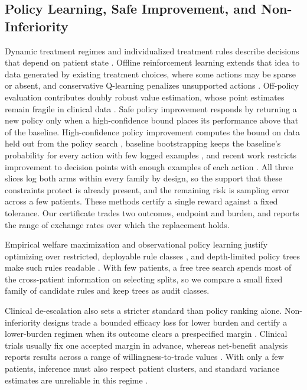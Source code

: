 \documentclass[conference]{IEEEtran}
\begin{document}
\subsection{Policy Learning, Safe Improvement, and Non-Inferiority}

Dynamic treatment regimes and individualized treatment rules describe decisions that depend on patient state \cite{murphy2003, qian2011}. Offline reinforcement learning extends that idea to data generated by existing treatment choices, where some actions may be sparse or absent, and conservative Q-learning penalizes unsupported actions \cite{levine2020, kumar2020}. Off-policy evaluation contributes doubly robust value estimation, whose point estimates remain fragile in clinical data \cite{dudik2011}. Safe policy improvement responds by returning a new policy only when a high-confidence bound places its performance above that of the baseline. High-confidence policy improvement computes the bound on data held out from the policy search \cite{thomas2015}, baseline bootstrapping keeps the baseline's probability for every action with few logged examples \cite{laroche2019}, and recent work restricts improvement to decision points with enough examples of each action \cite{sharma2025}. All three slices log both arms within every family by design, so the support that these constraints protect is already present, and the remaining risk is sampling error across a few patients. These methods certify a single reward against a fixed tolerance. Our certificate trades two outcomes, endpoint and burden, and reports the range of exchange rates over which the replacement holds.

Empirical welfare maximization and observational policy learning justify optimizing over restricted, deployable rule classes \cite{kitagawa2018, athey2021}, and depth-limited policy trees make such rules readable \cite{zhou2018}. With few patients, a free tree search spends most of the cross-patient information on selecting splits, so we compare a small fixed family of candidate rules and keep trees as audit classes.

Clinical de-escalation also sets a stricter standard than policy ranking alone. Non-inferiority designs trade a bounded efficacy loss for lower burden and certify a lower-burden regimen when its outcome clears a prespecified margin \cite{piaggio2012, iveson2018, grothey2018}. Clinical trials usually fix one accepted margin in advance, whereas net-benefit analysis reports results across a range of willingness-to-trade values \cite{stinnett1998, fenwick2001}. With only a few patients, inference must also respect patient clusters, and standard variance estimates are unreliable in this regime \cite{cameron2015}.
\end{document}
